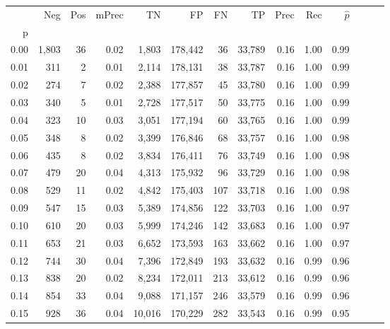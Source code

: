 \begin{tabular}{rrrrrrrrrrrrrr}
\toprule
{} &    Neg &  Pos & mPrec &       TN &       FP &      FN &      TP &  Prec &   Rec & $\hat{p}$ \\
p    &        &      &       &          &          &         &         &       &       &           \\
\midrule
0.00 &  1,803 &   36 &  0.02 &    1,803 &  178,442 &      36 &  33,789 &  0.16 &  1.00 &      0.99 \\
0.01 &    311 &    2 &  0.01 &    2,114 &  178,131 &      38 &  33,787 &  0.16 &  1.00 &      0.99 \\
0.02 &    274 &    7 &  0.02 &    2,388 &  177,857 &      45 &  33,780 &  0.16 &  1.00 &      0.99 \\
0.03 &    340 &    5 &  0.01 &    2,728 &  177,517 &      50 &  33,775 &  0.16 &  1.00 &      0.99 \\
0.04 &    323 &   10 &  0.03 &    3,051 &  177,194 &      60 &  33,765 &  0.16 &  1.00 &      0.99 \\
0.05 &    348 &    8 &  0.02 &    3,399 &  176,846 &      68 &  33,757 &  0.16 &  1.00 &      0.98 \\
0.06 &    435 &    8 &  0.02 &    3,834 &  176,411 &      76 &  33,749 &  0.16 &  1.00 &      0.98 \\
0.07 &    479 &   20 &  0.04 &    4,313 &  175,932 &      96 &  33,729 &  0.16 &  1.00 &      0.98 \\
0.08 &    529 &   11 &  0.02 &    4,842 &  175,403 &     107 &  33,718 &  0.16 &  1.00 &      0.98 \\
0.09 &    547 &   15 &  0.03 &    5,389 &  174,856 &     122 &  33,703 &  0.16 &  1.00 &      0.97 \\
0.10 &    610 &   20 &  0.03 &    5,999 &  174,246 &     142 &  33,683 &  0.16 &  1.00 &      0.97 \\
0.11 &    653 &   21 &  0.03 &    6,652 &  173,593 &     163 &  33,662 &  0.16 &  1.00 &      0.97 \\
0.12 &    744 &   30 &  0.04 &    7,396 &  172,849 &     193 &  33,632 &  0.16 &  0.99 &      0.96 \\
0.13 &    838 &   20 &  0.02 &    8,234 &  172,011 &     213 &  33,612 &  0.16 &  0.99 &      0.96 \\
0.14 &    854 &   33 &  0.04 &    9,088 &  171,157 &     246 &  33,579 &  0.16 &  0.99 &      0.96 \\
0.15 &    928 &   36 &  0.04 &   10,016 &  170,229 &     282 &  33,543 &  0.16 &  0.99 &      0.95 \\

\end{tabular}
